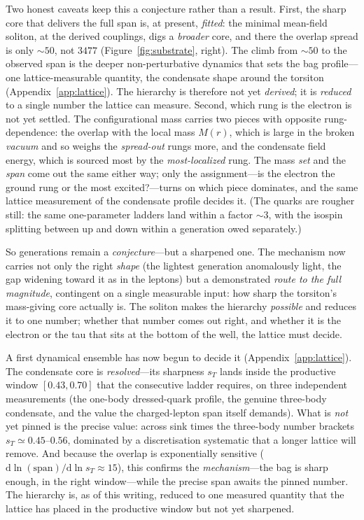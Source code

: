 Two honest caveats keep this a conjecture rather than a result. First, the sharp core that delivers
the full span is, at present, \emph{fitted}: the minimal mean-field soliton, at the derived couplings,
digs a \emph{broader} core, and there the overlap spread is only $\sim\!50$, not $3477$
(Figure~\ref{fig:substrate}, right). The climb from $\sim\!50$ to the observed span is the deeper
non-perturbative dynamics that sets the bag profile---one lattice-measurable quantity, the condensate
shape around the torsiton (Appendix~\ref{app:lattice}). The hierarchy is therefore not yet
\emph{derived}; it is \emph{reduced} to a single number the lattice can measure. Second, which rung is
the electron is not yet settled. The configurational mass carries two pieces with opposite
rung-dependence: the overlap with the local mass $M(r)$, which is large in the broken \emph{vacuum}
and so weighs the \emph{spread-out} rungs more, and the condensate field energy, which is sourced most
by the \emph{most-localized} rung. The mass \emph{set} and the \emph{span} come out the same either
way; only the assignment---is the electron the ground rung or the most excited?---turns on which piece
dominates, and the same lattice measurement of the condensate profile decides it. (The quarks are
rougher still: the same one-parameter ladders land within a factor $\sim\!3$, with the isospin
splitting between up and down within a generation owed separately.)

So generations remain a \emph{conjecture}---but a sharpened one. The mechanism now carries not only the
right \emph{shape} (the lightest generation anomalously light, the gap widening toward it as in the
leptons) but a demonstrated \emph{route to the full magnitude}, contingent on a single measurable
input: how sharp the torsiton's mass-giving core actually is. The soliton makes the hierarchy
\emph{possible} and reduces it to one number; whether that number comes out right, and whether it is
the electron or the tau that sits at the bottom of the well, the lattice must decide.

A first dynamical ensemble has now begun to decide it (Appendix~\ref{app:lattice}). The condensate
core is \emph{resolved}---its sharpness $s_T$ lands inside the productive window $[0.43,0.70]$ that
the consecutive ladder requires, on three independent measurements (the one-body dressed-quark
profile, the genuine three-body condensate, and the value the charged-lepton span itself demands).
What is \emph{not} yet pinned is the precise value: across sink times the three-body number brackets
$s_T\simeq0.45$--$0.56$, dominated by a discretisation systematic that a longer lattice will remove.
And because the overlap is exponentially sensitive ($\mathrm{d}\ln(\text{span})/\mathrm{d}\ln s_T
\approx15$), this confirms the \emph{mechanism}---the bag is sharp enough, in the right window---while
the precise span awaits the pinned number. The hierarchy is, as of this writing, reduced to one
measured quantity that the lattice has placed in the productive window but not yet sharpened.

